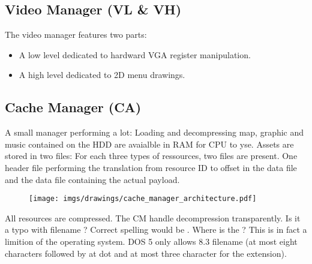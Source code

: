 \documentclass[book.tex]{subfiles}
\begin{document}
\subsection{Video Manager (VL \& VH)}
The video manager features two parts:
\begin{itemize}
\item A low level dedicated to hardward VGA register manipulation.
\item A high level dedicated to 2D menu drawings.
\end{itemize}
\par






\subsection{Cache Manager (CA)}
A small manager performing a lot: Loading and decompressing map, graphic and music contained on the HDD are avaialble in RAM for CPU to yse. Assets are stored in two files: For each three types of ressources, two files are present. One header file performing the translation from resource ID to  offset in the data file and the data file containing the actual payload.\\
 \par
\begin{figure}[H]
\centering
 \texttt{[image: imgs/drawings/cache\_manager\_architecture.pdf]}
 \end{figure}
 \par
{} All resources are compressed. The CM handle decompression transparently.
 Is it a typo with filename  ? Correct spelling would be . Where is the ? This is in fact a limition of the operating system. DOS 5 only allows 8.3 filename (at most eight characters followed by at dot and at most three character for the extension).
\end{document}
